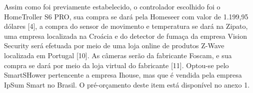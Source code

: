 	Assim como foi previamente estabelecido, o controlador escolhido foi o HomeTroller S6 PRO, sua compra se dará pela Homeseer com valor de 1.199,95 dólares [4], a compra do sensor de movimento e temperatura se dará na Zipato, uma empresa localizada na Croácia e do detector de fumaça da empresa Vision Security será efetuada por meio de uma loja online de produtos Z-Wave localizada em Portugal [10]. As câmeras serão da fabricante Foscam, e sua compra se dará por meio da loja virtual do fabricante [11].
	Optou-se pelo SmartSHower pertencente a empresa Ihouse, mas que é vendida pela empresa IpSum Smart no Brasil. O pré-orçamento deste item está disponível no anexo 1. 
































































































